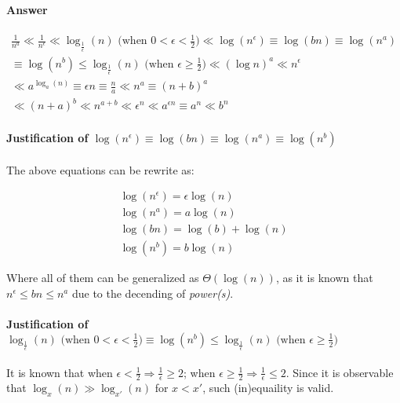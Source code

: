 \documentclass[12pt]{article}
\begin{document}
\paragraph{Answer}

\begin{gather}
    \frac{1}{n^a} \ll \frac{1}{n^\epsilon} \ll \log_{\frac{1}{\epsilon}}(n) \text{ \ (when $0 < \epsilon < \frac{1}{2}$)} \ll \log(n^\epsilon) \equiv \log(bn) \equiv \log(n^a) \\
    \equiv \log(n^b) \leq \log_{\frac{1}{\epsilon}}(n) \text{ \ (when $\epsilon \geq \frac{1}{2}$)} \ll (\log n)^a \ll n^{\epsilon} \\
    \ll a^{\log_a(n)} \equiv \epsilon n \equiv \frac{n}{a} \ll n^a \equiv (n+b)^a\\
    \ll (n+a)^b \ll n^{a+b} \ll \epsilon^n \ll a^{\epsilon n} \equiv a^n \ll b^n
\end{gather}


\paragraph{Justification of $\log(n^\epsilon) \equiv \log(bn) \equiv \log(n^a) \equiv \log(n^b)$\newline}

The above equations can be rewrite as:

\begin{gather}
    \log(n^\epsilon) = \epsilon \log(n) \\
    \log(n^a) = a \log(n) \\
    \log(bn) = \log(b) + \log(n) \\
    \log(n^b) = b \log(n)
\end{gather}

Where all of them can be generalized as $\Theta(\log(n))$, as it is known that $n^\epsilon \leq bn \leq n^a$ due to the decending of \textit{power(s)}.

\paragraph{Justification of $ \log_{\frac{1}{\epsilon}}(n) \text{ \ (when $0 < \epsilon < \frac{1}{2}$)} \equiv \log(n^b) \leq \log_{\frac{1}{\epsilon}}(n) \text{ \ (when $\epsilon \geq \frac{1}{2}$)}$\newline}


It is known that when $\epsilon < \frac{1}{2} \Rightarrow \frac{1}{\epsilon} \geq 2$; when $\epsilon \geq \frac{1}{2} \Rightarrow  \frac{1}{\epsilon} \leq 2$. Since it is observable that $\log_{x}(n) \gg \log_{x'}(n)$ for $x < x'$, such (in)equaility is valid.
\end{document}

